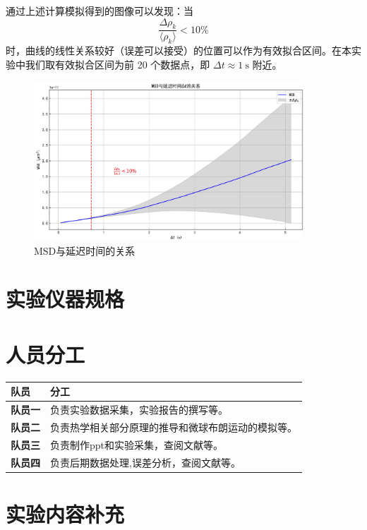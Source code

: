 \documentclass[a4paper]{report} %
\begin{document}
通过上述计算模拟得到的图像可以发现：当 
\[
\frac{\Delta \rho_k}{\langle \rho_k \rangle} < 10\%
\]
时，曲线的线性关系较好（误差可以接受）的位置可以作为有效拟合区间。在本实验中我们取有效拟合区间为前 20 个数据点，即 $\Delta t \approx 1 \ \text{s}$ 附近。

\begin{figure}[H]
    \centering
    \includegraphics[width=0.9\textwidth]{取1.jpg}
    \caption{MSD与延迟时间的关系}
    \label{fig:let1}
\end{figure}
\section{实验仪器规格}

\section{人员分工}
\renewcommand{\arraystretch}{1.3} %

\begin{tabularx}{\textwidth}{>{\bfseries}l X}
\toprule
队员 & 分工 \\
\midrule
队员一 & 负责实验数据采集，实验报告的撰写等。 \\
队员二 & 负责热学相关部分原理的推导和微球布朗运动的模拟等。 \\
队员三 & 负责制作ppt和实验采集，查阅文献等。 \\
队员四 & 负责后期数据处理,误差分析，查阅文献等。 \\
\bottomrule
\end{tabularx}

\section{实验内容补充}
\end{document}
